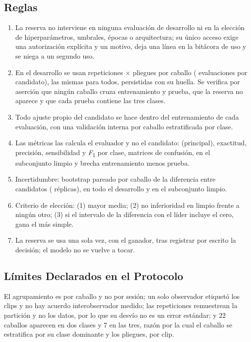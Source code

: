 \subsection{Reglas}
\begin{enumerate}
  \item La reserva no interviene en ninguna evaluación de desarrollo ni en la elección de hiperparámetros, umbrales, épocas o arquitectura; su único acceso exige una autorización explícita y un motivo, deja una línea en la bitácora de uso y se niega a un segundo uso.
  \item En el desarrollo se usan \Repeticiones{} repeticiones $\times$ \Folds{} pliegues por caballo (\Evaluaciones{} evaluaciones por candidato), las mismas para todos, persistidas con su huella. Se verifica por aserción que ningún caballo cruza entrenamiento y prueba, que la reserva no aparece y que cada prueba contiene las tres clases.
  \item Todo ajuste propio del candidato se hace dentro del entrenamiento de cada evaluación, con una validación interna por caballo estratificada por clase.
  \item Las métricas las calcula el evaluador y no el candidato: \fmacro{} (principal), exactitud, precisión, sensibilidad y \textit{F}\textsubscript{1} por clase, matrices de confusión, \fmacro{} en el subconjunto limpio y brecha entrenamiento menos prueba.
  \item Incertidumbre: bootstrap pareado por caballo de la diferencia entre candidatos (\ReplicasBootstrap{} réplicas), en todo el desarrollo y en el subconjunto limpio.
  \item Criterio de elección: (1) mayor \fmacro{} media; (2) no inferioridad en limpio frente a ningún otro; (3) si el intervalo de la diferencia con el líder incluye el cero, gana el más simple.
  \item La reserva se usa una sola vez, con el ganador, tras registrar por escrito la decisión; el modelo no se vuelve a tocar.
\end{enumerate}

\subsection{Límites Declarados en el Protocolo}
El agrupamiento es por caballo y no por sesión; un solo observador etiquetó los clips y no hay acuerdo interobservador medido; las repeticiones remuestrean la partición y no los datos, por lo que su desvío no es un error estándar; y 22 caballos aparecen en dos clases y 7 en las tres, razón por la cual el caballo se estratifica por su clase dominante y los pliegues, por clip.

